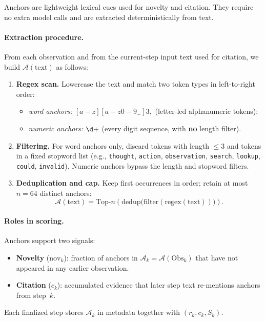 \documentclass[11pt]{article}
\begin{document}
Anchors are lightweight lexical cues used for novelty and citation.
They require no extra model calls and are extracted deterministically from text.

\paragraph{Extraction procedure.}
From each observation and from the current-step input text used for citation, we build $\mathcal{A}(\text{text})$ as follows:
\begin{enumerate}[leftmargin=*, nosep]
    \item \textbf{Regex scan.} Lowercase the text and match two token types in left-to-right order:
    \begin{itemize}[leftmargin=*, nosep]
        \item \emph{word anchors:} $[a-z][a-z0-9_-]{3,}$ (letter-led alphanumeric tokens);
        \item \emph{numeric anchors:} $\d+$ (every digit sequence, with \textbf{no} length filter).
    \end{itemize}
    \item \textbf{Filtering.} For word anchors only, discard tokens with length $\le 3$ and tokens in a fixed stopword list (e.g., \texttt{thought}, \texttt{action}, \texttt{observation}, \texttt{search}, \texttt{lookup}, \texttt{could}, \texttt{invalid}).
    Numeric anchors bypass the length and stopword filters.
    \item \textbf{Deduplication and cap.} Keep first occurrences in order; retain at most $n=64$ distinct anchors:
    \begin{equation}
        \mathcal{A}(\text{text}) = \text{Top-}n\!\left(\text{dedup}\big(\text{filter}(\text{regex}(\text{text}))\big)\right).
    \end{equation}
\end{enumerate}

\paragraph{Roles in scoring.}
Anchors support two signals:
\begin{itemize}[leftmargin=*, nosep]
    \item \textbf{Novelty} ($\mathrm{nov}_k$): fraction of anchors in $\mathcal{A}_k=\mathcal{A}(\text{Obs}_k)$ that have not appeared in any earlier observation.
    \item \textbf{Citation} ($c_k$): accumulated evidence that later step text re-mentions anchors from step~$k$.
\end{itemize}
Each finalized step stores $\mathcal{A}_k$ in metadata together with $(r_k,c_k,S_k)$.
\end{document}
